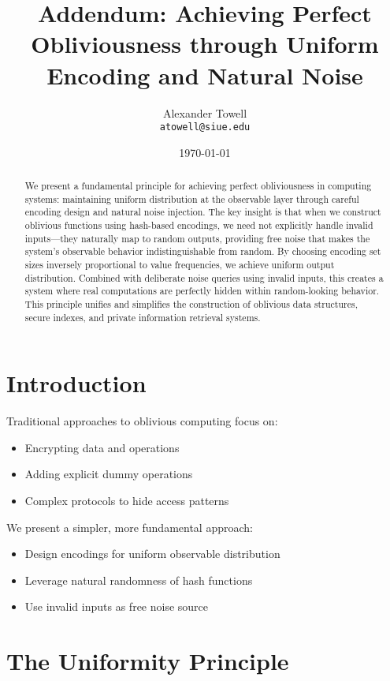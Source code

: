 \documentclass[11pt,final,hidelinks]{article}
\title{Addendum: Achieving Perfect Obliviousness through Uniform Encoding and Natural Noise}
\author{
    Alexander Towell\\
    \texttt{atowell@siue.edu}
}
\date{\today}
\begin{document}
\maketitle

\begin{abstract}
We present a fundamental principle for achieving perfect obliviousness in computing systems: maintaining uniform distribution at the observable layer through careful encoding design and natural noise injection. The key insight is that when we construct oblivious functions using hash-based encodings, we need not explicitly handle invalid inputs—they naturally map to random outputs, providing free noise that makes the system's observable behavior indistinguishable from random. By choosing encoding set sizes inversely proportional to value frequencies, we achieve uniform output distribution. Combined with deliberate noise queries using invalid inputs, this creates a system where real computations are perfectly hidden within random-looking behavior. This principle unifies and simplifies the construction of oblivious data structures, secure indexes, and private information retrieval systems.
\end{abstract}

\section{Introduction}

Traditional approaches to oblivious computing focus on:
\begin{itemize}
    \item Encrypting data and operations
    \item Adding explicit dummy operations
    \item Complex protocols to hide access patterns
\end{itemize}

We present a simpler, more fundamental approach:
\begin{itemize}
    \item Design encodings for uniform observable distribution
    \item Leverage natural randomness of hash functions
    \item Use invalid inputs as free noise source
\end{itemize}

\section{The Uniformity Principle}
\end{document}
